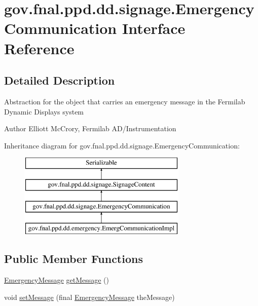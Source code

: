 \hypertarget{interfacegov_1_1fnal_1_1ppd_1_1dd_1_1signage_1_1EmergencyCommunication}{\section{gov.\-fnal.\-ppd.\-dd.\-signage.\-Emergency\-Communication Interface Reference}
\label{interfacegov_1_1fnal_1_1ppd_1_1dd_1_1signage_1_1EmergencyCommunication}
}


\subsection{Detailed Description}
Abstraction for the object that carries an emergency message in the Fermilab Dynamic Displays system

\begin{DoxyAuthor}{Author}
Elliott Mc\-Crory, Fermilab A\-D/\-Instrumentation 
\end{DoxyAuthor}
Inheritance diagram for gov.\-fnal.\-ppd.\-dd.\-signage.\-Emergency\-Communication\-:\begin{figure}[H]
\begin{center}
\leavevmode
\includegraphics[height=4.000000cm]{interfacegov_1_1fnal_1_1ppd_1_1dd_1_1signage_1_1EmergencyCommunication}
\end{center}
\end{figure}
\subsection*{Public Member Functions}
\begin{DoxyCompactItemize}
\item 
\hyperlink{classgov_1_1fnal_1_1ppd_1_1dd_1_1emergency_1_1EmergencyMessage}{Emergency\-Message} \hyperlink{interfacegov_1_1fnal_1_1ppd_1_1dd_1_1signage_1_1EmergencyCommunication_af923d219d82208a1ca4d947b8b726c56}{get\-Message} ()
\item 
void \hyperlink{interfacegov_1_1fnal_1_1ppd_1_1dd_1_1signage_1_1EmergencyCommunication_a11be4fd4ad5cada5a16903ba022d706b}{set\-Message} (final \hyperlink{classgov_1_1fnal_1_1ppd_1_1dd_1_1emergency_1_1EmergencyMessage}{Emergency\-Message} the\-Message)
\end{DoxyCompactItemize}


